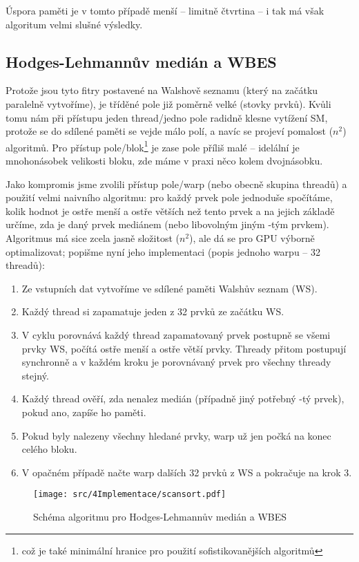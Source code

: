         Úspora paměti je v tomto případě menší -- limitně čtvrtina -- i tak má však algoritum velmi slušné výsledky.
        
    \subsection{Hodges-Lehmannův medián a WBES}
    
    Protože jsou tyto fitry postavené na Walshově seznamu (který na začátku paralelně vytvoříme), je tříděné pole již poměrně velké (stovky prvků). Kvůli tomu nám při přístupu jeden thread/jedno pole radidně klesne vytížení SM, protože se do sdílené paměti se vejde málo polí, a navíc se projeví pomalost \OOO($n^2$) algoritmů. Pro přístup pole/blok\footnote{což je také minimální hranice pro použití sofistikovanějších algoritmů} je zase pole příliš malé -- idelální je mnohonásobek velikosti bloku, zde máme v praxi něco kolem dvojnásobku.
    
    Jako kompromis jsme zvolili přístup pole/warp (nebo obecně skupina threadů) a použití velmi naivního algoritmu: pro každý prvek pole jednoduše spočítáme, kolik hodnot je ostře menší a ostře větších než tento prvek a na jejich základě určíme, zda je daný prvek mediánem (nebo libovolným jiným \kk-tým prvkem). Algoritmus má sice zcela jasně složitost \OOO($n^2$), ale dá se pro GPU výborně optimalizovat; popišme nyní jeho implementaci (popis jednoho warpu -- 32 threadů):
    \begin{enumerate}
      \item Ze vstupních dat vytvoříme ve sdílené paměti Walshův seznam (WS).
      \item Každý thread si zapamatuje jeden z 32 prvků ze začátku WS.
      \item V cyklu porovnává každý thread zapamatovaný prvek postupně se všemi prvky WS, počítá ostře menší a ostře větší prvky. Thready přitom postupují synchronně a v každém kroku je porovnávaný prvek pro všechny thready stejný.
      \item Každý thread ověří, zda nenalez medián (případně jiný potřebný \kk-tý prvek), pokud ano, zapíše ho paměti.
      \item Pokud byly nalezeny všechny hledané prvky, warp už jen počká na konec celého bloku.
      \item V opačném případě načte warp dalších 32 prvků z WS a pokračuje na krok 3.
    \end{enumerate}
    \begin{figure}[h]
    \begin{center}
      \texttt{[image: src/4Implementace/scansort.pdf]}
      \caption{Schéma algoritmu pro Hodges-Lehmannův medián a WBES}
    \end{center}
    \end{figure}
    
